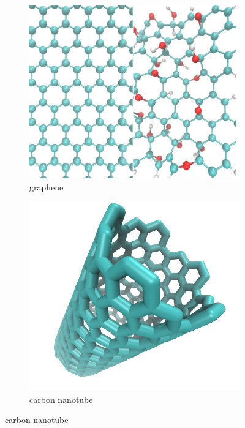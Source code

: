   \begin{figure}
  \centering
  \begin{subfigure}{0.45\textwidth}
  \includegraphics[width=\textwidth]{figs/graphene.pdf}
  \caption{graphene}\label{fig:graphene}
  \end{subfigure}
  \begin{subfigure}{0.45\textwidth}
  \includegraphics[width=\textwidth]{figs/cnt.png}
  \caption{carbon nanotube}\label{fig:cnt}
  \end{subfigure}

\end{figure}

